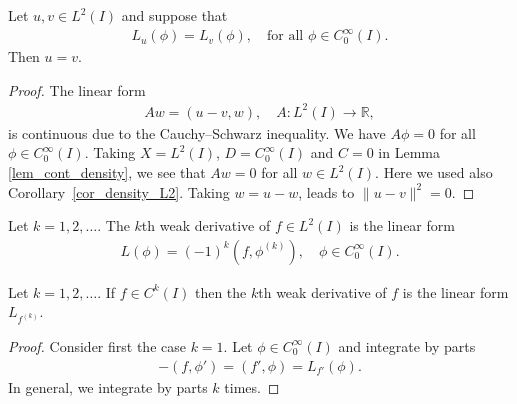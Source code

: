 \documentclass[12pt,oneside]{amsart}
\def\R{\mathbb R}
\begin{document}
\begin{lemma}
Let $u, v \in L^2(I)$ and suppose that 
    \begin{align*}
L_u(\phi) = L_v(\phi), \quad \text{for all $\phi \in C_0^\infty(I)$}.
    \end{align*}
Then $u = v$.
\end{lemma}
\begin{proof}
The linear form 
    \begin{align*}
A w = (u - v, w), \quad A : L^2(I) \to \R,
    \end{align*}
is continuous due to the Cauchy--Schwarz inequality.
We have $A \phi = 0$ for all $\phi \in C_0^\infty(I)$.
Taking $X=L^2(I)$, $D=C_0^\infty(I)$ and $C=0$ in Lemma \ref{lem_cont_density}, we see that $Aw = 0$ for all $w \in L^2(I)$.
Here we used also Corollary~\ref{cor_density_L2}.
Taking $w = u-w$, leads to $\|u-v\|^2 = 0$.
\end{proof}

\begin{definition}
Let $k=1,2,\dots$.
The $k$th weak derivative of $f \in L^2(I)$ is the linear form
    \begin{align*}
L(\phi) = (-1)^k (f, \phi^{(k)}), \quad \phi \in C_0^\infty(I).
    \end{align*}
\end{definition}

\begin{lemma}\label{lem_weak_classic}
Let $k=1,2,\dots$.
If $f \in C^k(I)$ then the $k$th weak derivative of $f$ is the linear form $L_{f^{(k)}}$.
\end{lemma}
\begin{proof}
Consider first the case $k=1$.
Let $\phi \in C_0^\infty(I)$ and integrate by parts
    \begin{align*}
-(f, \phi') = (f', \phi) = L_{f'}(\phi).
    \end{align*}
In general, we integrate by parts $k$ times. 
\end{proof}
\end{document}
